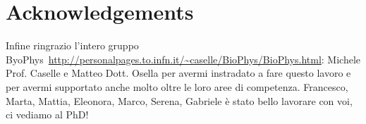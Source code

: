 \chapter*{Acknowledgements}

Infine ringrazio l'intero gruppo ByoPhys~\url{http://personalpages.to.infn.it/~caselle/BioPhys/BioPhys.html}: Michele Prof. Caselle e Matteo Dott. Osella per avermi instradato a fare questo lavoro e per avermi supportato anche molto oltre le loro aree di competenza. 
Francesco, Marta, Mattia, Eleonora, Marco, Serena, Gabriele è stato bello lavorare con voi, ci vediamo al PhD!
